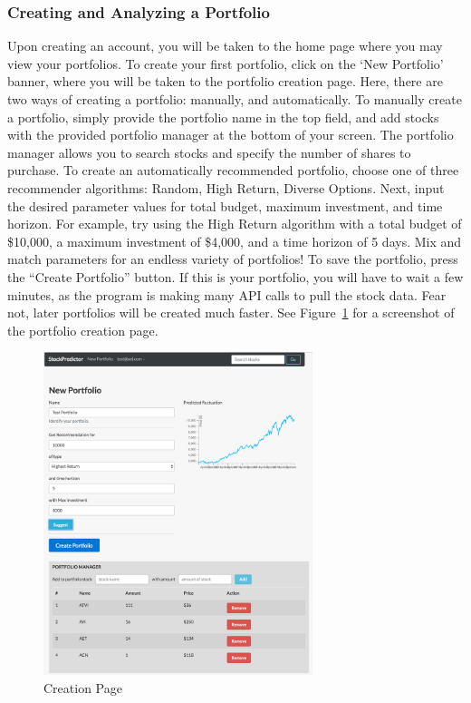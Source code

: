 \documentclass{article}
\begin{document}
\subsubsection{Creating and Analyzing a Portfolio}
Upon creating an account, you will be taken to the home page where you may view your portfolios. To create your first portfolio, click on the `New Portfolio' banner, where you will be taken to the portfolio creation page. Here, there are two ways of creating a portfolio: manually, and automatically. To manually create a portfolio, simply provide the portfolio name in the top field, and add stocks with the provided portfolio manager at the bottom of your screen. The portfolio manager allows you to search stocks and specify the number of shares to purchase. To create an automatically recommended portfolio, choose one of three recommender algorithms: Random, High Return, Diverse Options. Next, input the desired parameter values for total budget, maximum investment, and time horizon. For example, try using the High Return algorithm with a total budget of \$10,000, a maximum investment of \$4,000, and a time horizon of 5 days. Mix and match parameters for an endless variety of portfolios! To save the portfolio, press the ``Create Portfolio'' button. If this is your portfolio, you will have to wait a few minutes, as the program is making many API calls to pull the stock data. Fear not, later portfolios will be created much faster. See Figure~\ref{fig:creation} for a screenshot of the portfolio creation page.

\begin{figure}[H]
\begin{center}
\includegraphics[width=0.7\textwidth]{creation}
\caption{\label{fig:creation} Creation Page}
\end{center}
\end{figure}
\end{document}
